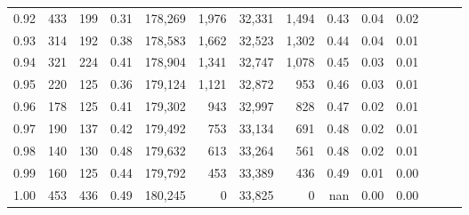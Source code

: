 \begin{tabular}{rrrrrrrrrrrrrr}
0.92 &    433 &  199 &  0.31 &  178,269 &    1,976 &  32,331 &   1,494 &  0.43 &  0.04 &      0.02 \\
0.93 &    314 &  192 &  0.38 &  178,583 &    1,662 &  32,523 &   1,302 &  0.44 &  0.04 &      0.01 \\
0.94 &    321 &  224 &  0.41 &  178,904 &    1,341 &  32,747 &   1,078 &  0.45 &  0.03 &      0.01 \\
0.95 &    220 &  125 &  0.36 &  179,124 &    1,121 &  32,872 &     953 &  0.46 &  0.03 &      0.01 \\
0.96 &    178 &  125 &  0.41 &  179,302 &      943 &  32,997 &     828 &  0.47 &  0.02 &      0.01 \\
0.97 &    190 &  137 &  0.42 &  179,492 &      753 &  33,134 &     691 &  0.48 &  0.02 &      0.01 \\
0.98 &    140 &  130 &  0.48 &  179,632 &      613 &  33,264 &     561 &  0.48 &  0.02 &      0.01 \\
0.99 &    160 &  125 &  0.44 &  179,792 &      453 &  33,389 &     436 &  0.49 &  0.01 &      0.00 \\
1.00 &    453 &  436 &  0.49 &  180,245 &        0 &  33,825 &       0 &   nan &  0.00 &      0.00 \\
\bottomrule
\end{tabular}
